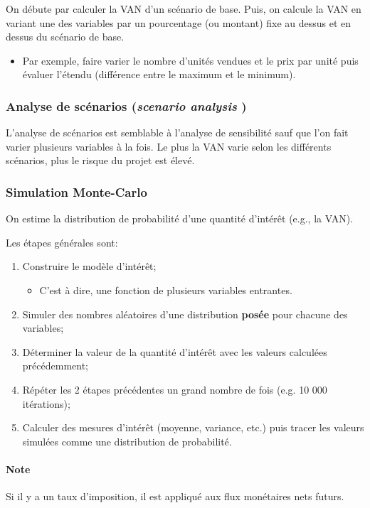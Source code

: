 \documentclass[10pt, french]{article}
\begin{document}
\begin{multicols*}{2}
On débute par calculer la VAN d'un scénario de base. Puis, on calcule la VAN en variant une des variables par un pourcentage (ou montant) fixe au dessus et en dessus du scénario de base. 
\begin{itemize}
	\item	Par exemple, faire varier le nombre d'unités vendues et le prix par unité puis évaluer l'étendu (différence entre le maximum et le minimum).
\end{itemize}


\subsubsection{Analyse de scénarios (\og \textit{scenario analysis} \fg{})}
L'analyse de scénarios est semblable à l'analyse de sensibilité sauf que l'on fait varier plusieurs variables à la fois. Le plus la VAN varie selon les différents scénarios, plus le risque du projet est élevé.


\subsubsection{Simulation Monte-Carlo}
On estime la distribution de probabilité d'une quantité d'intérêt (e.g., la VAN).

Les étapes générales sont:
\begin{enumerate}[leftmargin = *]
	\item	Construire le modèle d'intérêt;
		\begin{itemize}
		\item	C'est à dire, une fonction de plusieurs variables entrantes.
		\end{itemize}
	\item	Simuler des nombres aléatoires d'une distribution \textbf{posée} pour chacune des variables;
	\item	Déterminer la valeur de la quantité d'intérêt avec les valeurs calculées précédemment;
	\item	Répéter les 2 étapes précédentes un grand nombre de fois (e.g. 10 000 itérations);
	\item	Calculer des mesures d'intérêt (moyenne, variance, etc.) puis tracer les valeurs simulées comme une distribution de probabilité.
\end{enumerate}

\paragraph{Note}	Si il y a un taux d'imposition, il est appliqué aux flux monétaires nets futurs.



\end{multicols*}
\end{document}
